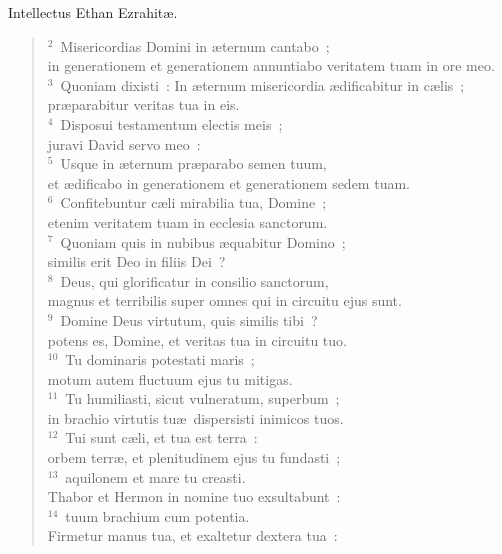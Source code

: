 \lettrine[lines=3,image=true,loversize=0.05,lraise=-0.03]{I}{}ntellectus Ethan Ezrahit\ae .
\begin{flushleft}\begin{verse}\vspace{6pt}${}^{2}$~Misericordias Domini in \ae ternum cantabo~;\\ in generationem et generationem annuntiabo veritatem tuam in ore meo.\\
${}^{3}$~Quoniam dixisti~: In \ae ternum misericordia \ae dificabitur in c\ae lis~;\\ pr\ae parabitur veritas tua in eis.\\
${}^{4}$~Disposui testamentum electis meis~;\\ juravi David servo meo~:\\
${}^{5}$~Usque in \ae ternum pr\ae parabo semen tuum,\\ et \ae dificabo in generationem et generationem sedem tuam.\\
${}^{6}$~Confitebuntur c\ae li mirabilia tua, Domine~;\\ etenim veritatem tuam in ecclesia sanctorum.\\
${}^{7}$~Quoniam quis in nubibus \ae quabitur Domino~;\\ similis erit Deo in filiis Dei~?\\
${}^{8}$~Deus, qui glorificatur in consilio sanctorum,\\ magnus et terribilis super omnes qui in circuitu ejus sunt.\\
${}^{9}$~Domine Deus virtutum, quis similis tibi~?\\ potens es, Domine, et veritas tua in circuitu tuo.\\
${}^{10}$~Tu dominaris potestati maris~;\\ motum autem fluctuum ejus tu mitigas.\\
${}^{11}$~Tu humiliasti, sicut vulneratum, superbum~;\\ in brachio virtutis tu\ae\ dispersisti inimicos tuos.\\
${}^{12}$~Tui sunt c\ae li, et tua est terra~:\\ orbem terr\ae , et plenitudinem ejus tu fundasti~;\\
${}^{13}$~aquilonem et mare tu creasti.\\ Thabor et Hermon in nomine tuo exsultabunt~:\\
${}^{14}$~tuum brachium cum potentia.\\ Firmetur manus tua, et exaltetur dextera tua~:\\

\end{verse}
\end{flushleft}
